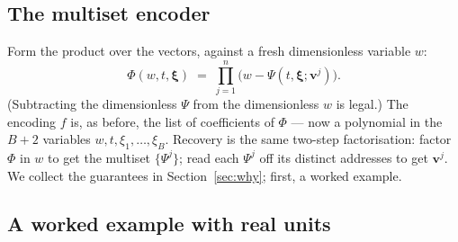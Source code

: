 \documentclass[11pt,a4paper]{article}
\theoremstyle{definition}
\theoremstyle{plain}
\newcommand{\bvec}[1]{\mathbf{#1}}
\begin{document}
\subsection{The multiset encoder}

Form the product over the vectors, against a fresh dimensionless variable $w$:
\begin{equation}\label{eq:Phi}
   \Phi(w,t,\boldsymbol\xi)\;=\;\prod_{j=1}^{n}
        \bigl(w-\Psi(t,\boldsymbol\xi;\bvec v^j)\bigr).
\end{equation}
(Subtracting the dimensionless $\Psi$ from the dimensionless $w$ is legal.) The
encoding $f$ is, as before, the list of coefficients of $\Phi$ --- now a polynomial
in the $B+2$ variables $w,t,\xi_1,\dots,\xi_B$. Recovery is the same two-step
factorisation: factor $\Phi$ in $w$ to get the multiset $\{\Psi^j\}$; read each
$\Psi^j$ off its distinct addresses to get $\bvec v^j$. We collect the guarantees
in Section~\ref{sec:why}; first, a worked example.

\subsection{A worked example with real units}
\end{document}
